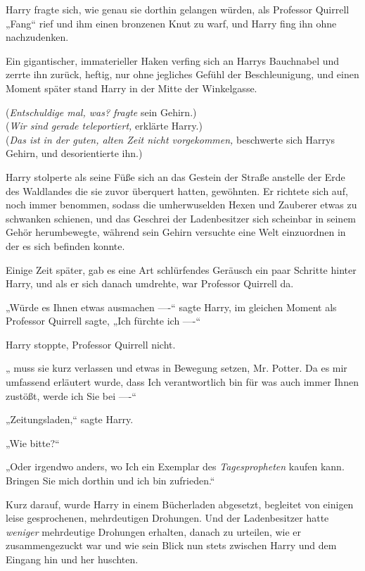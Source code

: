 {Harry fragte sich, wie genau sie dorthin gelangen würden, als Professor Quirrell „Fang“ rief und ihm einen bronzenen Knut zu warf, und Harry fing ihn ohne nachzudenken.

Ein gigantischer, immaterieller Haken verfing sich an Harrys Bauchnabel und zerrte ihn zurück, heftig, nur ohne jegliches Gefühl der Beschleunigung, und einen Moment später stand Harry in der Mitte der Winkelgasse.

(\emph{Entschuldige mal, was? fragte} sein Gehirn.)\\ (\emph{Wir sind gerade teleportiert,} erklärte Harry.)\\ (\emph{Das ist in der guten, alten Zeit nicht vorgekommen,} beschwerte sich Harrys Gehirn, und desorientierte ihn.)

Harry stolperte als seine Füße sich an das Gestein der Straße anstelle der Erde des Waldlandes die sie zuvor überquert hatten, gewöhnten. Er richtete sich auf, noch immer benommen, sodass die umherwuselden Hexen und Zauberer etwas zu schwanken schienen, und das Geschrei der Ladenbesitzer sich scheinbar in seinem Gehör herumbewegte, während sein Gehirn versuchte eine Welt einzuordnen in der es sich befinden konnte.

Einige Zeit später, gab es eine Art schlürfendes Geräusch ein paar Schritte hinter Harry, und als er sich danach umdrehte, war Professor Quirrell da.

„Würde es Ihnen etwas ausmachen ----“ sagte Harry, im gleichen Moment als Professor Quirrell sagte, „Ich fürchte ich ----“

Harry stoppte, Professor Quirrell nicht.

„ muss sie kurz verlassen und etwas in Bewegung setzen, Mr. Potter. Da es mir umfassend erläutert wurde, dass Ich verantwortlich bin für was auch immer Ihnen zustößt, werde ich Sie bei ----“

„Zeitungsladen,“ sagte Harry.

„Wie bitte?“

„Oder irgendwo anders, wo Ich ein Exemplar des \emph{Tagespropheten} kaufen kann. Bringen Sie mich dorthin und ich bin zufrieden.“

Kurz darauf, wurde Harry in einem Bücherladen abgesetzt, begleitet von einigen leise gesprochenen, mehrdeutigen Drohungen. Und der Ladenbesitzer hatte \emph{weniger} mehrdeutige Drohungen erhalten, danach zu urteilen, wie er zusammengezuckt war und wie sein Blick nun stets zwischen Harry und dem Eingang hin und her huschten.

}
